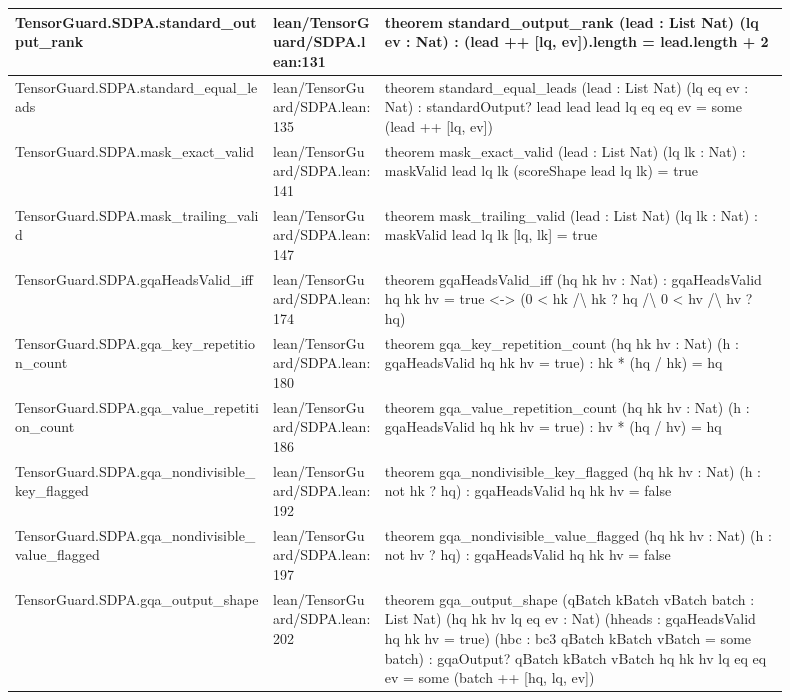 \documentclass[10pt]{article}
\begin{document}
\begin{longtable}{|p{0.30\linewidth}|p{0.13\linewidth}|p{0.47\linewidth}|}
\hline
TensorGuard.SDPA.standard\_output\_rank & lean/TensorGuard/SDPA.lean:131 & theorem standard\_output\_rank (lead : List Nat) (lq ev : Nat) : (lead ++ [lq, ev]).length = lead.length + 2 \\
\hline
TensorGuard.SDPA.standard\_equal\_leads & lean/TensorGuard/SDPA.lean:135 & theorem standard\_equal\_leads (lead : List Nat) (lq eq ev : Nat) : standardOutput? lead lead lead lq eq eq ev = some (lead ++ [lq, ev]) \\
\hline
TensorGuard.SDPA.mask\_exact\_valid & lean/TensorGuard/SDPA.lean:141 & theorem mask\_exact\_valid (lead : List Nat) (lq lk : Nat) : maskValid lead lq lk (scoreShape lead lq lk) = true \\
\hline
TensorGuard.SDPA.mask\_trailing\_valid & lean/TensorGuard/SDPA.lean:147 & theorem mask\_trailing\_valid (lead : List Nat) (lq lk : Nat) : maskValid lead lq lk [lq, lk] = true \\
\hline
TensorGuard.SDPA.gqaHeadsValid\_iff & lean/TensorGuard/SDPA.lean:174 & theorem gqaHeadsValid\_iff (hq hk hv : Nat) : gqaHeadsValid hq hk hv = true <-> (0 < hk /\textbackslash{} hk ? hq /\textbackslash{} 0 < hv /\textbackslash{} hv ? hq) \\
\hline
TensorGuard.SDPA.gqa\_key\_repetition\_count & lean/TensorGuard/SDPA.lean:180 & theorem gqa\_key\_repetition\_count (hq hk hv : Nat) (h : gqaHeadsValid hq hk hv = true) : hk * (hq / hk) = hq \\
\hline
TensorGuard.SDPA.gqa\_value\_repetition\_count & lean/TensorGuard/SDPA.lean:186 & theorem gqa\_value\_repetition\_count (hq hk hv : Nat) (h : gqaHeadsValid hq hk hv = true) : hv * (hq / hv) = hq \\
\hline
TensorGuard.SDPA.gqa\_nondivisible\_key\_flagged & lean/TensorGuard/SDPA.lean:192 & theorem gqa\_nondivisible\_key\_flagged (hq hk hv : Nat) (h : not  hk ? hq) : gqaHeadsValid hq hk hv = false \\
\hline
TensorGuard.SDPA.gqa\_nondivisible\_value\_flagged & lean/TensorGuard/SDPA.lean:197 & theorem gqa\_nondivisible\_value\_flagged (hq hk hv : Nat) (h : not  hv ? hq) : gqaHeadsValid hq hk hv = false \\
\hline
TensorGuard.SDPA.gqa\_output\_shape & lean/TensorGuard/SDPA.lean:202 & theorem gqa\_output\_shape (qBatch kBatch vBatch batch : List Nat) (hq hk hv lq eq ev : Nat) (hheads : gqaHeadsValid hq hk hv = true) (hbc : bc3 qBatch kBatch vBatch = some batch) : gqaOutput? qBatch kBatch vBatch hq hk hv lq eq eq ev = some (batch ++ [hq, lq, ev]) \\

\end{longtable}
\end{document}
